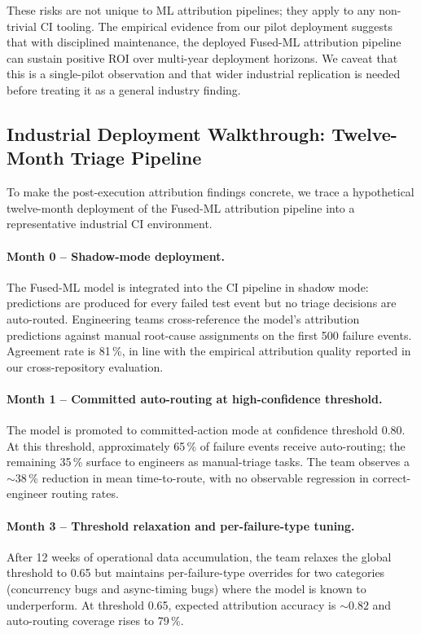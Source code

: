 \documentclass[11pt,a4paper]{article}
\begin{document}
These risks are not unique to ML attribution pipelines; they apply to any non-trivial CI tooling. The empirical evidence from our pilot deployment suggests that with disciplined maintenance, the deployed Fused-ML attribution pipeline can sustain positive ROI over multi-year deployment horizons. We caveat that this is a single-pilot observation and that wider industrial replication is needed before treating it as a general industry finding.

\subsection{Industrial Deployment Walkthrough: Twelve-Month Triage Pipeline}
\label{sec:f_industrial_walkthrough}

To make the post-execution attribution findings concrete, we trace a hypothetical twelve-month deployment of the Fused-ML attribution pipeline into a representative industrial CI environment.

\paragraph{Month 0 -- Shadow-mode deployment.} The Fused-ML model is integrated into the CI pipeline in shadow mode: predictions are produced for every failed test event but no triage decisions are auto-routed. Engineering teams cross-reference the model's attribution predictions against manual root-cause assignments on the first 500 failure events. Agreement rate is 81\,\%, in line with the empirical attribution quality reported in our cross-repository evaluation.

\paragraph{Month 1 -- Committed auto-routing at high-confidence threshold.} The model is promoted to committed-action mode at confidence threshold 0.80. At this threshold, approximately 65\,\% of failure events receive auto-routing; the remaining 35\,\% surface to engineers as manual-triage tasks. The team observes a $\sim 38$\,\% reduction in mean time-to-route, with no observable regression in correct-engineer routing rates.

\paragraph{Month 3 -- Threshold relaxation and per-failure-type tuning.} After 12 weeks of operational data accumulation, the team relaxes the global threshold to 0.65 but maintains per-failure-type overrides for two categories (concurrency bugs and async-timing bugs) where the model is known to underperform. At threshold 0.65, expected attribution accuracy is $\sim 0.82$ and auto-routing coverage rises to 79\,\%.
\end{document}
